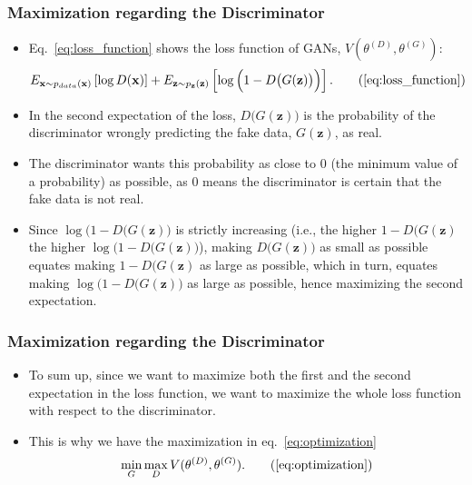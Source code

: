 \documentclass{beamer}
\begin{document}
\begin{frame}
\setlength{\leftmargini}{0.3cm}
\setlength{\leftmarginii}{0.6cm}
\setlength{\leftmarginiii}{0.9cm}
\frametitle{Maximization regarding the Discriminator}
\begin{itemize}
\item Eq.~\eqref{eq:loss_function} shows the loss function of GANs, $V(\theta^{(D)}, \theta^{(G)})$:
\begin{equation}
E_{\mathbf{x}\sim p_{data}(\mathbf{x})}\left[\log D(\mathbf{x}) \right] + E_{\mathbf{z}\sim p_{\mathbf{z}}(\mathbf{z})}\left[\log \Big(1 - D \big(G(\mathbf{z}) \big) \Big) \right].
\tag{\ref{eq:loss_function}}
\end{equation}
\item In the second expectation of the loss, $D\big(G(\mathbf{z}) \big)$ is the probability of the discriminator wrongly predicting the fake data, $G(\mathbf{z})$, as real.
\item The discriminator wants this probability as close to 0 (the minimum value of a probability) as possible, as 0 means the discriminator is certain that the fake data is not real.
\item Since $\log \Big(1 - D \big(G(\mathbf{z}) \Big)$ is strictly increasing (i.e., the higher $1 - D \big(G(\mathbf{z})$ the higher $\log \Big(1 - D \big(G(\mathbf{z}) \Big)$), making $D\big(G(\mathbf{z}) \big)$ as small as possible equates making $1 - D \big(G(\mathbf{z})$ as large as possible, which in turn, equates making $\log \Big(1 - D \big(G(\mathbf{z}) \Big)$ as large as possible, hence maximizing the second expectation.
\end{itemize}
\end{frame}

\begin{frame}
\setlength{\leftmargini}{0.3cm}
\setlength{\leftmarginii}{0.6cm}
\setlength{\leftmarginiii}{0.9cm}
\frametitle{Maximization regarding the Discriminator}
\begin{itemize}
\item To sum up, since we want to maximize both the first and the second expectation in the loss function, we want to maximize the whole loss function with respect to the discriminator.
\item This is why we have the maximization in eq.~\eqref{eq:optimization}
\begin{equation}
\min_{G} \max_{D} V(\theta^{(D)}, \theta^{(G)}).
\tag{\ref{eq:optimization}}
\end{equation}
\end{itemize}
\end{frame}
\end{document}

